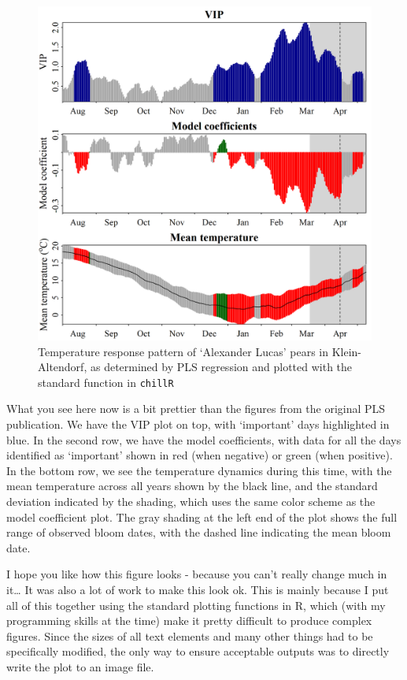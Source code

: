 \documentclass[
]{book}
\begin{document}
\begin{figure}
\centering
\includegraphics{pictures/PLS_out.png}
\caption{Temperature response pattern of `Alexander Lucas' pears in Klein-Altendorf, as determined by PLS regression and plotted with the standard function in \texttt{chillR}}
\end{figure}

What you see here now is a bit prettier than the figures from the original PLS publication. We have the VIP plot on top, with `important' days highlighted in blue. In the second row, we have the model coefficients, with data for all the days identified as `important' shown in red (when negative) or green (when positive). In the bottom row, we see the temperature dynamics during this time, with the mean temperature across all years shown by the black line, and the standard deviation indicated by the shading, which uses the same color scheme as the model coefficient plot. The gray shading at the left end of the plot shows the full range of observed bloom dates, with the dashed line indicating the mean bloom date.

I hope you like how this figure looks - because you can't really change much in it\ldots{} It was also a lot of work to make this look ok. This is mainly because I put all of this together using the standard plotting functions in R, which (with my programming skills at the time) make it pretty difficult to produce complex figures. Since the sizes of all text elements and many other things had to be specifically modified, the only way to ensure acceptable outputs was to directly write the plot to an image file.
\end{document}
